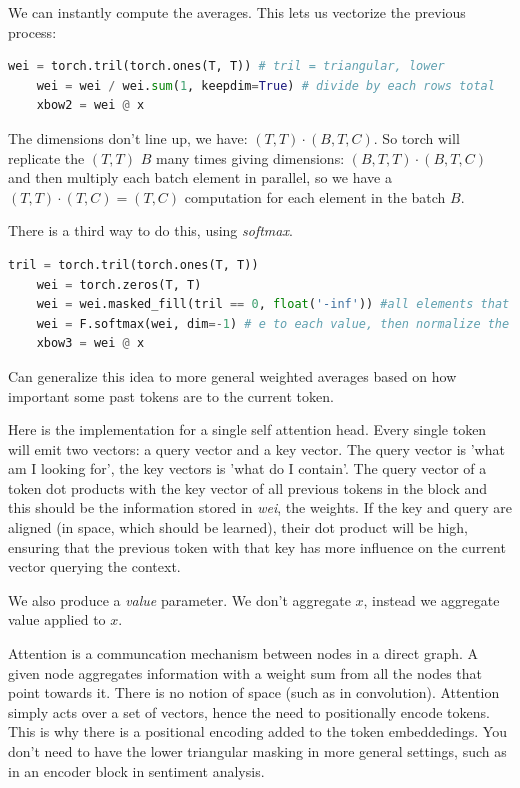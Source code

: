\documentclass{article}
\begin{document}
We can instantly compute the averages.
This lets us vectorize the previous process:
\begin{lstlisting}[language=Python]
    wei = torch.tril(torch.ones(T, T)) # tril = triangular, lower
    wei = wei / wei.sum(1, keepdim=True) # divide by each rows total
    xbow2 = wei @ x 
\end{lstlisting}
The dimensions don't line up, we have: $(T, T)\cdot (B, T, C)$.  
So torch will replicate the $(T, T)$ $B$ many times giving dimensions: $(B, T, T) \cdot (B, T, C)$ and then multiply each batch element in parallel, so we have a $(T, T)\cdot (T, C) = (T, C)$ computation for each element in the batch $B$.

There is a third way to do this, using \emph{softmax}.
\begin{lstlisting}[language=Python]
    tril = torch.tril(torch.ones(T, T))
    wei = torch.zeros(T, T)
    wei = wei.masked_fill(tril == 0, float('-inf')) #all elements that are zero in tril (lower triangular) become -infinity
    wei = F.softmax(wei, dim=-1) # e to each value, then normalize the rows to sum to 1
    xbow3 = wei @ x
\end{lstlisting}
Can generalize this idea to more general weighted averages based on how important some past tokens are to the current token.  

Here is the implementation for a single self attention head.
Every single token will emit two vectors: a query vector and a key vector.
The query vector is 'what am I looking for', the key vectors is 'what do I contain'.
The query vector of a token dot products with the key vector of all previous tokens in the block and this should be the information stored in \emph{wei}, the weights.  If the key and query are aligned (in space, which should be learned), their dot product will be high, ensuring that the previous token with that key has more influence on the current vector querying the context.

We also produce a \emph{value} parameter.  We don't aggregate $x$, instead we aggregate value applied to $x$.

Attention is a communcation mechanism between nodes in a direct graph.  A given node aggregates information with a weight sum from all the nodes that point towards it.
There is no notion of space (such as in convolution).  Attention simply acts over a set of vectors, hence the need to positionally encode tokens.
This is why there is a positional encoding added to the token embeddedings.
You don't need to have the lower triangular masking in more general settings, such as in an encoder block in sentiment analysis.
\end{document}

